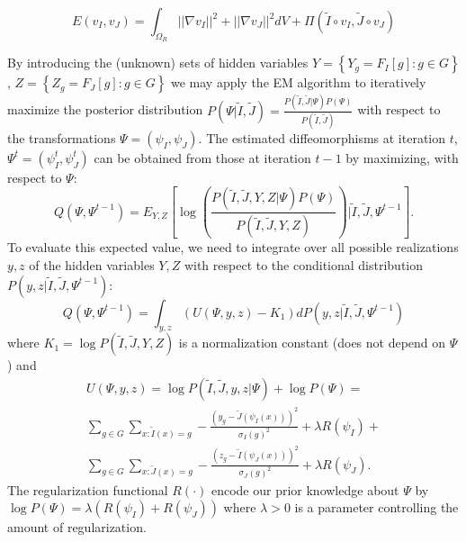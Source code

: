 \begin{equation}\label{eq:greedy_syn_energy}
    E(v_{I}, v_{J}) = \int_{\Omega_{R}} ||\nabla v_{I}||^{2}+||\nabla v_{J}||^{2}dV + \Pi(\tilde{I}\circ v_{I}, \tilde{J}\circ v_{J})
\end{equation}











By introducing the (unknown) sets of hidden variables $Y = \left\lbrace Y_{g}=F_{I}[g] : g\in G \right\rbrace$, $Z = \left\lbrace Z_g = F_{J}[g] : g \in G\right\rbrace$ we may
apply the EM algorithm to iteratively maximize the posterior distribution
$P(\Psi | \tilde{I}, \tilde{J}) = \frac{P(\tilde{I}, \tilde{J} | \Psi)P(\Psi)}{P(\tilde{I}, \tilde{J})}$ with respect to the transformations
$\Psi = (\psi_{I}, \psi_{J})$. The estimated diffeomorphisms at iteration $t$, $\Psi^{t} = \left( \psi_{I}^{t}, \psi_{J}^{t}\right)$ can be obtained from those at iteration
$t-1$ by maximizing, with respect to $\Psi$:
\begin{equation}
	Q(\Psi, \Psi^{t-1}) = E_{Y,Z}\left[\log \left( \frac{P(\tilde{I}, \tilde{J}, Y, Z|\Psi)P(\Psi)}{P(\tilde{I}, \tilde{J}, Y, Z)}\right) | \tilde{I}, \tilde{J}, \Psi^{t-1}\right].
\end{equation}
To evaluate this expected value, we need to integrate over all possible realizations $y, z$ of the hidden variables $Y, Z$ with respect to the conditional distribution $P(y,z| \tilde{I}, \tilde{J}, \Psi^{t-1})$:
\begin{equation}\label{eq:expected_value}
Q(\Psi, \Psi^{t-1}) = \int_{y,z} (U(\Psi, y, z) - K_1)dP(y,z| \tilde{I}, \tilde{J}, \Psi^{t-1})
\end{equation}
where $K_{1} =\log P(\tilde{I}, \tilde{J}, Y, Z)$ is a normalization constant (does not depend on $\Psi$) and
\begin{align}\label{eq:SyNEM_objective}
	U(\Psi, y, z) = \log P(\tilde{I}, \tilde{J}, y, z|\Psi) + \log P(\Psi)=\\
    \nonumber\sum_{g\in G} \sum_{x : \tilde{I}(x) = g} -\frac{\left(y_g - \tilde{J}(\psi_{I}(x))\right)^{2}}{\sigma_{I}(g)^{2}} + \lambda R(\psi_{I})+\\
    \nonumber\sum_{g\in G} \sum_{x : \tilde{J}(x) = g} -\frac{\left(z_g - \tilde{I}(\psi_{J}(x))\right)^{2}}{\sigma_{J}(g)^{2}} + \lambda R(\psi_{J}).
\end{align}
The regularization functional $R(\cdot)$ encode our prior knowledge about $\Psi$ by $\log P(\Psi) = \lambda \left( R(\psi_{I}) + R(\psi_{J})\right)$ where $\lambda > 0$ is a parameter controlling the amount of regularization.\\

